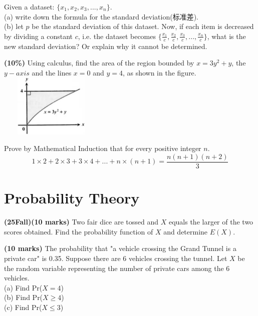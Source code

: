 \documentclass{article}
\begin{document}
\vspace{3\baselineskip}

\noindent Given a dataset: $\{x_1, x_2, x_3,...,x_n\}$.\\
(a) write down the formula for the standard deviation(标准差).\\
(b) let $p$ be the standard deviation of this dataset. Now, if each item is decreased by dividing a constant $c$, i.e. the dataset becomes $\{\frac{x_1}{c}, \frac{x_2}{c}, \frac{x_3}{c},...,\frac{x_n}{c}\}$, what is the new standard deviation? Or explain why it cannot be determined.

\vspace{3\baselineskip}

\noindent \textbf{(10\%)} Using calculus, find the area of the region bounded by $x = 3y^2+y$, the $y-axis$ and the lines $x=0$ and $y = 4$, as shown in the figure.\\

\hfill
\includegraphics[width=5cm, height=3cm]{graph2.png}

\vspace{3\baselineskip}

\noindent Prove by Mathematical Induction that for every positive integer $n$.
$$1\times2+2\times3+3\times4+...+n\times(n+1) = \frac{n(n+1)(n+2)}{3}$$

\vspace{6\baselineskip}


\section{Probability Theory}

\noindent \textbf{(25Fall)(10 marks)} Two fair dice are tossed and $X$ equals the larger of the two scores obtained. Find the probability function of $X$ and determine $E(X)$. \\

\vspace{3\baselineskip}

\noindent \textbf{(10 marks)} The probability that "a vehicle crossing the Grand Tunnel is a private car" is 0.35. Suppose there are 6 vehicles crossing the tunnel. Let $X$ be the random variable representing the number of private cars among the 6 vehicles.\\
\indent (a) Find Pr($X = 4$) \\
\indent (b) Find Pr($X \ge 4$) \\
\indent (c) Find Pr($X \le 3$) \\
\end{document}
